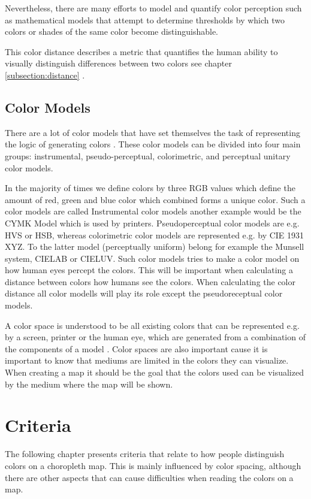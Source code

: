 Nevertheless, there are many efforts to model and quantify color perception such as mathematical models that attempt to determine thresholds by which two colors or shades of the same color become distinguishable. 

This color distance describes a metric that quantifies the human ability to visually distinguish differences between two colors see chapter \ref{subsection:distance} \parencite{coltekin2017}.

\subsection{Color Models}
There are a lot of color models that have set themselves the task of representing the logic of generating colors \parencite{kuehni2001}. These color models can be divided into four main groups: instrumental, pseudo-perceptual, colorimetric, and perceptual unitary color models.

In the majority of times we define colors by three RGB values which define the amount of red, green and blue color which combined forms a unique color. Such a color models are called Instrumental color models another example would be the CYMK Model which is used by printers.
Pseudoperceptual color models are e.g. HVS or HSB, whereas colorimetric color models are represented e.g. by CIE 1931 XYZ.
To the latter model (perceptually uniform) belong for example the Munsell system, CIELAB or CIELUV. Such color models tries to make a color model on how human eyes percept the colors. This will be important when calculating a distance between colors how humans see the colors. When calculating the color distance all color modells will play its role except the pseudoreceptual color models. 

A color space is understood to be all existing colors that can be represented e.g. by a screen, printer or the human eye, which are generated from a combination of the components of a model \parencite{munsell1915}. Color spaces are also important cause it is important to know that mediums are limited in the colors they can visualize. When creating a map it should be the goal that the colors used can be visualized by the medium where the map will be shown.  

\section{Criteria}
The following chapter presents criteria that relate to how people distinguish colors on a choropleth map. This is mainly influenced by color spacing, although there are other aspects that can cause difficulties when reading the colors on a map.

